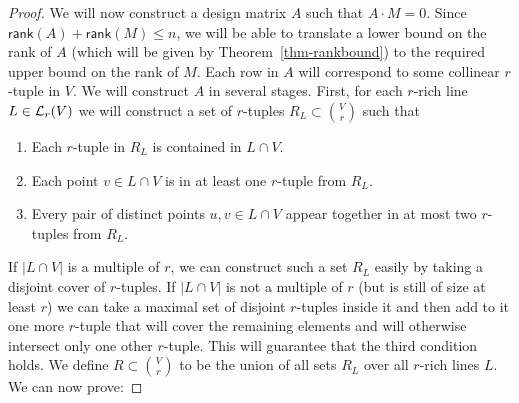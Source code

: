 \documentclass[11pt]{article}
\def\cL{{\cal L}}
\def\rank{\textsf{rank}}
\begin{document}
\begin{proof}
We will now construct a design matrix $A$ such that $A \cdot M=0$. Since $\rank(A) + \rank(M) \leq n$, we will be able to translate a lower bound on the rank of $A$ (which will be given by Theorem~\ref{thm-rankbound}) to the required upper bound on the rank of $M$.  Each row in  $A$ will correspond to some collinear $r$-tuple in $V$. We will construct $A$ in several stages. First, for each $r$-rich line $L \in \cL_r(V)$ we will construct a set of $r$-tuples $R_L \subset \binom{V}{r}$ such that
\begin{enumerate}
	\item Each $r$-tuple in $R_L$ is contained in  $L \cap V$.
	\item Each point $v \in L \cap V$ is in at least one $r$-tuple from $R_L$.
	\item Every pair of distinct points $u,v \in L \cap V$ appear together in at most two $r$-tuples from $R_L$.
\end{enumerate}
If $|L \cap V|$ is a multiple of $r$, we can construct such a set $R_L$ easily by taking a disjoint cover of $r$-tuples. If $|L \cap V|$ is not a multiple of $r$ (but is still of size at least $r$) we can take a maximal set of disjoint $r$-tuples inside it and then add to it one more $r$-tuple that will cover the remaining elements and will otherwise intersect only one other $r$-tuple. This will guarantee  that the third condition holds. We define $R \subset {V \choose r}$ to be the union of all sets $R_L$ over all $r$-rich lines $L$.  We can now prove:


\end{proof}
\end{document}
